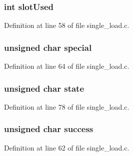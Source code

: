 \subsubsection[{\texorpdfstring{slot\+Used}{slotUsed}}]{\setlength{\rightskip}{0pt plus 5cm}int slot\+Used}\hypertarget{structstate_slot__t_a3610d3548adf444e0e2ef1e0d877b651}{}\label{structstate_slot__t_a3610d3548adf444e0e2ef1e0d877b651}


Definition at line 58 of file single\+\_\+load.\+c.

\subsubsection[{\texorpdfstring{special}{special}}]{\setlength{\rightskip}{0pt plus 5cm}unsigned char special}\hypertarget{structstate_slot__t_a6371714c4934187b2ed0fadea23c846d}{}\label{structstate_slot__t_a6371714c4934187b2ed0fadea23c846d}


Definition at line 64 of file single\+\_\+load.\+c.

\subsubsection[{\texorpdfstring{state}{state}}]{\setlength{\rightskip}{0pt plus 5cm}unsigned char state}\hypertarget{structstate_slot__t_ab12828525693568ae9c217805bea1ef9}{}\label{structstate_slot__t_ab12828525693568ae9c217805bea1ef9}


Definition at line 78 of file single\+\_\+load.\+c.

\subsubsection[{\texorpdfstring{success}{success}}]{\setlength{\rightskip}{0pt plus 5cm}unsigned char success}\hypertarget{structstate_slot__t_a520ac11e1908a743c9bf08ae832a9280}{}\label{structstate_slot__t_a520ac11e1908a743c9bf08ae832a9280}


Definition at line 62 of file single\+\_\+load.\+c.

